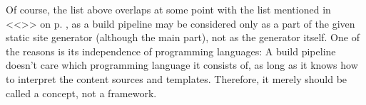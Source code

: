 Of course, the list above overlaps at some point with the list mentioned in <<\emph{}>> on p. \pageref{par:creatingcontent}, as a build pipeline may be considered only as a part of the given static site generator (although the main part), not as the generator itself. One of the reasons is its independence of programming languages: A build pipeline doesn't care which programming language it consists of, as long as it knows how to interpret the content sources and templates. Therefore, it merely should be called a concept, not a framework.




\vspace{20pt}



\vspace{20pt}


